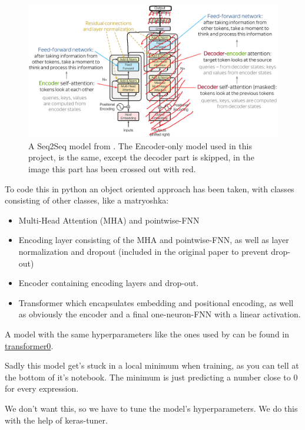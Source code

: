 \documentclass{article}
\begin{document}
\begin{figure}[htbp]
    \centering
    \includegraphics[width=0.5\paperwidth]{images/transformerSeq2Seq.png}
    \caption{A Seq2Seq model from \cite{vaswani2023attentionneed}. The 
    Encoder-only model used in this project, is the same, except the decoder 
    part is skipped, in the image this part has been crossed out with red.}
    \label{fig:transformerSeq2Seq}
\end{figure}

To code this in python an object oriented approach has been taken, with 
classes consisting of other classes, like a matryoshka: 

\begin{itemize}
    \item Multi-Head Attention (MHA) and pointwise-FNN
    \item Encoding layer consisting of the MHA and pointwise-FNN, as well as 
layer normalization and dropout (included in the original paper to prevent 
drop-out)
    \item Encoder containing encoding layers and drop-out.
    \item Transformer which encapsulates embedding and positional encoding, 
as well as obviously the encoder and a final one-neuron-FNN with a linear 
activation.
\end{itemize}

A model with the same hyperparameters like the ones used by \cite{vaswani2023attentionneed} 
can be found in \href{https://github.com/AntonStantan/matura/blob/main/transformer/transformer0.ipynb}
{transformer0}.

Sadly this model get's stuck in a local minimum when training, as you can 
tell at the bottom of it's notebook. The minimum is just predicting a number 
close to 0 for every expression.

We don't want this, so we have to tune the model's hyperparameters.
We do this with the help of keras-tuner. 
\end{document}
